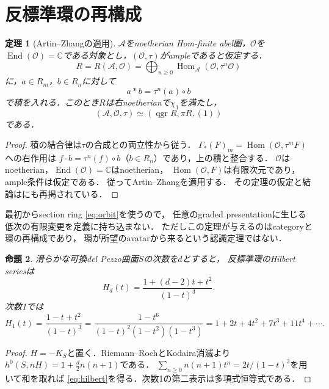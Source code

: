 \documentclass[11pt,a4paper]{ltjsarticle}
\newtheorem{theorem}{定理}[section]
\newtheorem{proposition}[theorem]{命題}
\theoremstyle{definition}
\newcommand{\OO}{\mathcal O}
\renewcommand{\AA}{\mathcal A}
\newcommand{\Hom}{\operatorname{Hom}}
\newcommand{\End}{\operatorname{End}}
\newcommand{\qgr}{\operatorname{qgr}}
\begin{document}
\section{反標準環の再構成}
\begin{theorem}[Artin--Zhangの適用]\label{thm:az}
$\AA$をnoetherian Hom-finite abel圏，$\OO$を
$\End(\OO)=\mathbb C$である対象とし，$(\OO,\tau)$がampleであると仮定する．
\begin{equation}\label{eq:orbit}
 R=R(\AA,\OO)=\bigoplus_{n\geq0}\Hom_{\AA}(\OO,\tau^n\OO)
\end{equation}
に，$a\in R_m$，$b\in R_n$に対して
\begin{equation}\label{eq:multiplication}
 a*b=\tau^n(a)\circ b
\end{equation}
で積を入れる．このとき$R$は右noetherianで$\chi_1$を満たし，
\begin{equation}\label{eq:az}
 (\AA,\OO,\tau)\simeq(\qgr R,\pi R,(1))
\end{equation}
である．
\end{theorem}
\begin{proof}
積の結合律は$\tau$の合成との両立性から従う．
$\Gamma_*(F)_m=\Hom(\OO,\tau^mF)$への右作用は
$f\cdot b=\tau^n(f)\circ b$（$b\in R_n$）であり，上の積と整合する．
$\OO$はnoetherian，$\End(\OO)=\mathbb C$はnoetherian，
$\Hom(\OO,F)$は有限次元であり，ample条件は仮定である．
従ってArtin--Zhang\cite[Theorem 4.5(1)]{AZ}を適用する．
その定理の仮定と結論は\cite[Theorem 7.3]{Orbifold}にも再掲されている．
\end{proof}

最初からsection ring \eqref{eq:orbit}を使うので，
任意のgraded presentationに生じる低次の有限変更を定義に持ち込まない．
ただしこの定理が与えるのはcategoryと環の再構成であり，
環が所望のavatarから来るという認識定理ではない．

\begin{proposition}\label{prop:hilbert}
滑らかな可換del Pezzo曲面$S$の次数を$d$とすると，
反標準環のHilbert seriesは
\begin{equation}\label{eq:hilbert}
 H_d(t)=\frac{1+(d-2)t+t^2}{(1-t)^3}.
\end{equation}
次数1では
\begin{equation}\label{eq:hilbert-one}
 H_1(t)=\frac{1-t+t^2}{(1-t)^3}
 =\frac{1-t^6}{(1-t)^2(1-t^2)(1-t^3)}
 =1+2t+4t^2+7t^3+11t^4+\cdots.
\end{equation}
\end{proposition}
\begin{proof}
$H=-K_S$と置く．Riemann--RochとKodaira消滅より
$h^0(S,nH)=1+\frac d2 n(n+1)$である．
$\sum_{n\geq0}n(n+1)t^n=2t/(1-t)^3$を用いて和を取れば
\eqref{eq:hilbert}を得る．次数1の第二表示は多項式恒等式である．
\end{proof}
\end{document}
